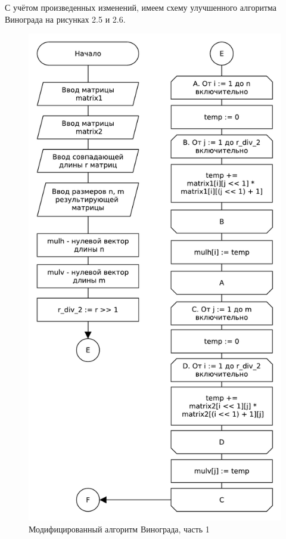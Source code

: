 С учётом произведенных изменений, имеем схему улучшенного алгоритма Винограда на рисунках 2.5 и 2.6.
\begin{figure}[H]
    \centering
    \includegraphics[scale=0.75]{pdf/owinograd-part1.pdf}
    \caption{Модифицированный алгоритм Винограда, часть 1}
\end{figure}

